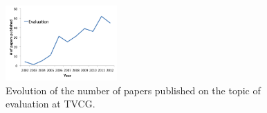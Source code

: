 

\begin{figure}
  \begin{center}
\includegraphics[width=0.38\textwidth]{chapter6/figures/evaluation_tvcg.png}
  \end{center}
  \caption{\label{fig:tvcg}Evolution of the number of papers published on the topic of evaluation at TVCG.}
\end{figure}
 
